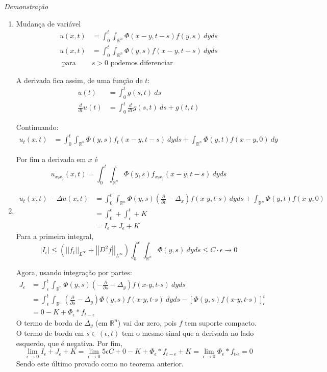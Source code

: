 \documentclass[11pt]{article}
\newcommand{\Rn}{{\mathbb{R}^n}}
\newcommand{\p}{\partial}
\newcommand{\e}{\epsilon}
\newcommand{\pde}[2]{\frac{\p #1}{\p #2}}
\newcommand{\mi}{\text{-}}
\newcommand{\norm}[2]{\left|\left|#1\right|\right|_{L^{#2}}}
\begin{document}
\textit{Demonstração}\begin{enumerate}
	\item Mudança de variável \begin{align*}
		u(x,t)&=\int_0^t \int_\Rn \Phi(x-y,t-s) f(y,s)\ dy ds \\
		u(x,t)&=\int_0^t \int_\Rn \Phi(y,s) f(x-y,t-s)\ dy ds \\
		\text{ para } &s>0 \text{ podemos diferenciar }
	\end{align*}

	A derivada fica assim, de uma função de \(t\): \begin{align*}
		u(t) &= \int_0^t g(s,t)\ ds \\
		\frac{d}{dt}u(t) &= \int_0^t \frac{d}{dt}g(s,t)\ ds + g(t,t)
	\end{align*}

	Continuando: \begin{align*}
		u_t(x,t)&=\int_0^t \int_\Rn \Phi(y,s) f_t(x-y,t-s)\ dy ds + \int_\Rn \Phi(y,t) f(x-y,0)\ dy
	\end{align*}

	Por fim a derivada em \(x\) é \[u_{x_ix_j}(x,t)=\int_0^t \int_\Rn \Phi(y,s) f_{x_ix_j}(x-y,t-s)\ dy ds\]
	\item \begin{align*}
		u_t(x,t) - \Delta u(x,t) &= \int_0^t \int_\Rn \Phi(y,s) \left( \pde{}{t} - \Delta_x \right)f(x\mi y,t\mi s)\ dy ds + \int_\Rn \Phi(y,t) f(x\mi y,0)\\
		&= \int_0^\e + \int_\e^t  + K \\
		&= I_\e + J_\e + K
	\end{align*}
	Para a primeira integral,
	\[|I_\e| \leq \left( \norm{f_t}{\infty} + \norm{D^2f}{\infty} \right)\int_0^\e  \int_\Rn \Phi(y,s)\ dy ds \leq C \cdot \e \rightarrow 0 \]
	
	Agora, usando integração por partes:
	\begin{align*}
		J_\e &= \int_\e^t \int_\Rn \Phi(y,s) \left(-\pde{}{s} -\Delta_y\right)f(x\mi y, t\mi s)\ dy ds \\
		&= \int_\e^t \int_\Rn \left(\pde{}{s} - \Delta_y\right) \Phi(y,s)f(x\mi y, t\mi s)\ dy ds - \left[ \Phi(y,s) f(x\mi y, t\mi s)\right]_\e^t\\
		&=0 -K + \Phi_\e * f_{t-\e}
	\end{align*}
	O termo de borda de \(\Delta_y\) (em \(\Rn\)) vai dar zero, pois \(f\) tem suporte compacto. O termo de borda em \(s \in (\e, t)\) tem o mesmo sinal que a derivada no lado esquerdo, que é negativa.
	Por fim,
	\[\lim_{\e \rightarrow 0} I_\e + J_\e + K = \lim_{\e \rightarrow 0} 5\e C  + 0 - K + \Phi_\e * f_{t-\e} + K =\lim_{\e \rightarrow 0} \Phi_\e * f_{t\mi \e} = 0 \]
	Sendo este último provado como no teorema anterior.
	

\end{enumerate}
\end{document}

